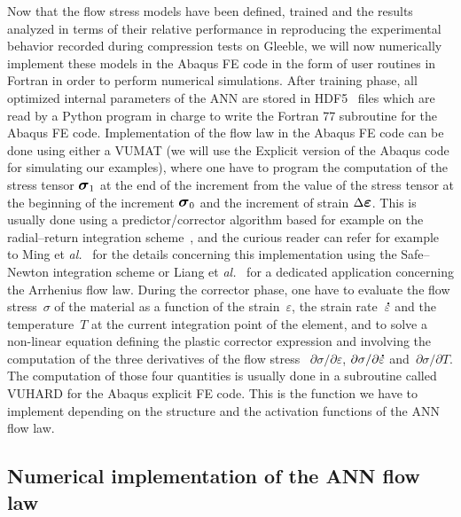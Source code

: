 \documentclass[algorithms,article,submit,pdftex,oneauthors]{Definitions/mdpi}
\makeatletter
\DeclareRobustCommand{\mdot}[1]{\accentset{\mbox{\bfseries .}}{#1}}
\DeclareRobustCommand{\eal}{et \emph{al.}\@\xspace}
\DeclareRobustCommand{\Sig}{\mbox{\large\ensuremath{\boldsymbol{\sigma}}}}
\DeclareRobustCommand{\Eps}{\mbox{\large\ensuremath{\boldsymbol{\varepsilon}}}}
\makeatother
\begin{document}
Now that the flow stress models have been defined, trained and the results analyzed in terms of their relative performance in reproducing the experimental behavior recorded during compression tests on Gleeble, we will now numerically implement these models in the Abaqus FE code in the form of user routines in Fortran in order to perform numerical simulations.
After training phase, all optimized internal parameters of the ANN are stored in HDF5~\cite{Koranne-2011-HDF} files which are read by a Python program in charge to write the Fortran 77 subroutine for the Abaqus FE code.
Implementation of the flow law in the Abaqus FE code can be done using either a VUMAT (we will use the Explicit version of the Abaqus code for simulating our examples), where one have to program the computation of the stress tensor $\Sig_{1}$ at the end of the increment from the value of the stress tensor at the beginning of the increment $\Sig_{0}$ and the increment of strain $\Delta\Eps$.
This is usually done using a predictor/corrector algorithm based for example on the radial--return integration scheme~\cite{Ponthot-2002-USU}, and the curious reader can refer for example to Ming \eal~\cite{Ming-2018-ERV} for the details concerning this implementation using the Safe--Newton integration scheme or Liang \eal~\cite{Liang-2022} for a dedicated application concerning the Arrhenius flow law.
During the corrector phase, one have to evaluate the flow stress~$\sigma$ of the material as a function of the strain~$\varepsilon$, the strain rate~$\mdot{\varepsilon}$ and the temperature~$T$ at the current integration point of the element, and to solve a non-linear equation defining the plastic corrector expression and involving the computation of the three derivatives of the flow stress ~$\partial\sigma/\partial\varepsilon$, $\partial\sigma/\partial\mdot{\varepsilon}$ and~$\partial\sigma/\partial T$.
The computation of those four quantities is usually done in a subroutine called VUHARD for the Abaqus explicit FE code.
This is the function we have to implement depending on the structure and the activation functions of the ANN flow law.

\subsection{Numerical implementation of the ANN flow law}\label{subsec:Num-impl}
\end{document}

